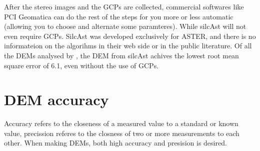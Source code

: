 \documentclass[a4paper,UKenglish]{article}
\begin{document}
After the stereo images and the GCPs are collected, commercial softwares like PCI Geomatica can do the rest of the steps for you more or less automatic (allowing you to choose and alternate some paramteres). While silcAst will not even require GCPs. SilcAst was developed exclusively for ASTER, and there is no informateion on the algorihms in their web side or in the public literature. Of all the DEMs analysed by \cite{toutin08}, the DEM from silcAst achives the lowest root mean square error of 6.1, even without the use of GCPs.

\section{DEM accuracy}

Accuracy refers to the closeness of a measured value to a standard or known value, precission referes to the closness of two or more measurements to each other. When making DEMs, both high accuracy and presision is desired.



\end{document}
